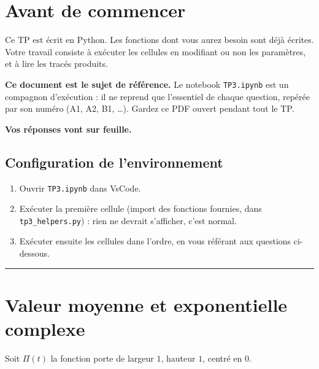 \documentclass[a4paper,11pt]{article}
\title{\chapterTitle}
\author{}
\date{}
\makeatletter
\newcounter{question}[section]
\renewcommand\maketitle{{\raggedright\begin{center}
    {\Huge\bfseries\@title}
\end{center}}}
\makeatother
\begin{document}
\selectfont
\fontsize{12pt}{14pt}\selectfont

\maketitle
\thispagestyle{fancy}


\section*{Avant de commencer}

Ce TP est écrit en Python. Les fonctions dont vous aurez besoin sont déjà
écrites. Votre travail consiste à exécuter les cellules en modifiant ou
non les paramètres, et à lire les tracés produits.

\textbf{Ce document est le sujet de référence.} Le notebook
\texttt{TP3.ipynb} est un compagnon d'exécution : il ne reprend que
l'essentiel de chaque question, repérée par son numéro (A1, A2, B1,
\dots). Gardez ce PDF ouvert pendant tout le TP.

\textbf{Vos réponses vont sur feuille.}

\subsection*{Configuration de l'environnement}
\begin{enumerate}
    \item Ouvrir \texttt{TP3.ipynb} dans VsCode.
    \item Exécuter la première cellule (import des fonctions fournies,
          dans \texttt{tp3\_helpers.py}) : rien ne devrait s'afficher,
          c'est normal.
    \item Exécuter ensuite les cellules dans l'ordre, en vous référant aux
          questions ci-dessous.
\end{enumerate}

\vspace{2em}\hrule\vspace{2em}
\newpage


\section{Valeur moyenne et exponentielle complexe}

Soit $\Pi(t)$ la fonction porte de largeur $1$, hauteur $1$, centré en $0$.
\end{document}
